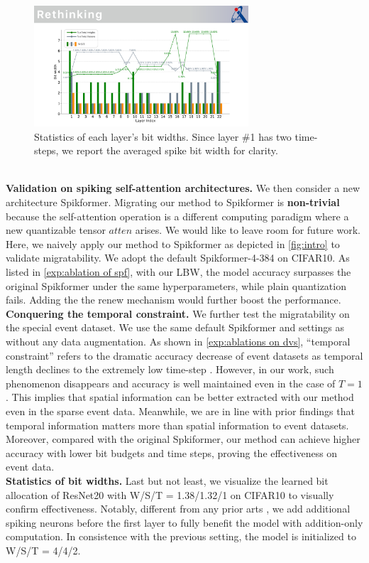 \begin{figure}[b]
  \centering
  \includegraphics[width= 8cm]{figs/bit_vis.pdf}
  \caption{Statistics of each layer's bit widths. Since layer \#1 has two time-steps, we report the averaged spike bit width for clarity.}
  \label{fig:bit_vis}
\end{figure}
\\\textbf{Validation on spiking self-attention architectures.}
We then consider a new architecture Spikformer. Migrating our method to Spikformer is \textbf{non-trivial} because the self-attention operation is a different computing paradigm where a new quantizable tensor $atten$ arises. We would like to leave room for future work. Here, we naively apply our method to Spikformer as depicted in  \cref{fig:intro} to validate migratability.  We adopt the default Spikformer-4-384 \cite{zhou2022spikformer} on CIFAR10. As listed in  \cref{exp:ablation of spf}, with our LBW, the model accuracy surpasses the original Spikformer under the same hyperparameters, while plain quantization fails. Adding the the renew mechanism would further boost the performance.
\\\textbf{Conquering the temporal constraint.}
We further test the migratability on the special event dataset. We use the same default Spikformer and settings as  \cite{shen2024conventional} without any data augmentation. As shown in  \cref{exp:ablations on dvs}, “temporal constraint” refers to the dramatic accuracy decrease of event datasets as temporal length declines to the extremely low time-step \cite{shen2024conventional}. However, in our work, such phenomenon disappears and accuracy is well maintained even in the case of $T=1$. 
This implies that spatial information can be better extracted with our method even in the sparse event data.
Meanwhile, we are in line with prior findings that temporal information matters more than spatial information to event datasets. 
Moreover, compared with the original Spkiformer, our method can achieve higher accuracy with lower bit budgets
and time steps, proving the effectiveness on event data.
\\\textbf{Statistics of bit widths.} Last but not least, we visualize the learned bit allocation of ResNet20 with W/S/T = 1.38/1.32/1 on CIFAR10 to visually confirm effectiveness. Notably, different from any prior arts \cite{guo2024ternary,zheng2021going,fang2021deep}, we add additional spiking neurons before the first layer to fully benefit the model with addition-only computation. In consistence with the previous setting, the model is initialized to W/S/T = 4/4/2. 
